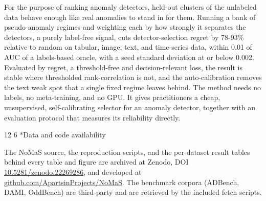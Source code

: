 \documentclass[3p,twocolumn]{elsarticle}
\makeatletter
\renewcommand\section{\@startsection{section}{1}{\z@}%
           {12\p@ \@plus 4\p@ \@minus 4\p@}%
           {6\p@ \@plus 4\p@ \@minus 3\p@}%
           {\normalsize\bfseries\boldmath}}
\makeatother
\begin{document}
For the purpose of ranking anomaly detectors, held-out clusters of the unlabeled data behave enough like real anomalies to stand in for them. Running a bank of pseudo-anomaly regimes and weighting each by how strongly it separates the detectors, a purely label-free signal, cuts detector-selection regret by 78-93\% relative to random on tabular, image, text, and time-series data, within 0.01 of AUC of a labels-based oracle, with a seed standard deviation at or below 0.002. Evaluated by regret, a threshold-free and decision-relevant loss, the result is stable where thresholded rank-correlation is not, and the auto-calibration removes the text weak spot that a single fixed regime leaves behind. The method needs no labels, no meta-training, and no GPU. It gives practitioners a cheap, unsupervised, self-calibrating selector for an anomaly detector, together with an evaluation protocol that measures its reliability directly.

\section*{Data and code availability}\label{data-and-code-availability}

The NoMaS source, the reproduction scripts, and the per-dataset result tables behind every table and figure are archived at Zenodo, DOI \href{https://doi.org/10.5281/zenodo.22269286}{10.5281/zenodo.22269286}, and developed at \href{https://github.com/ApartsinProjects/NoMaS}{github.com/ApartsinProjects/NoMaS}. The benchmark corpora (ADBench, DAMI, OddBench) are third-party and are retrieved by the included fetch scripts.
\end{document}
